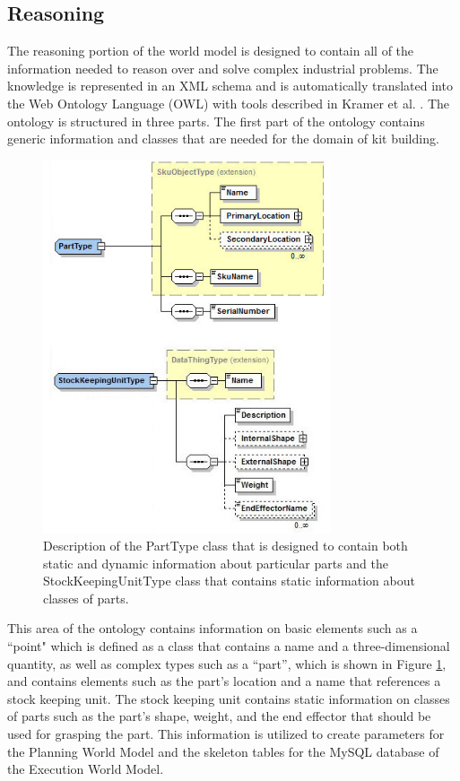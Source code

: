 \subsection{Reasoning}
The reasoning portion of the world model is designed to contain all of the information needed to reason over and solve complex industrial
problems. The knowledge is represented in an XML schema and is automatically translated into the Web Ontology Language (OWL) with
tools described in Kramer et al. \cite{kramer2014}. The  ontology is structured in three parts. The first part of the ontology contains generic information and classes that are needed for the domain of kit building. 
%
\begin{figure}[htb!]
\begin{center}
\includegraphics[width=8.5cm]{images/PartSKUV2.jpg}
\caption{Description of the PartType class that is designed to contain both static and dynamic information about particular parts and the StockKeepingUnitType class that contains static information about classes of parts.}
\label{fig:part}
\end{center}
\end{figure}
%
This area of the ontology contains information on basic elements such as a ``point" which is defined as a class that contains a name 
and a three-dimensional quantity, as well as complex types such as a ``part'', which is
shown in Figure \ref{fig:part}, and
contains elements such as the part's location and a name that references a stock keeping unit. The stock keeping unit contains static information on classes of parts such as the part's shape, weight, and the end effector that should be used for grasping the part. This information is utilized to create parameters for the Planning World
Model and the skeleton tables for the MySQL database of the Execution World Model.

